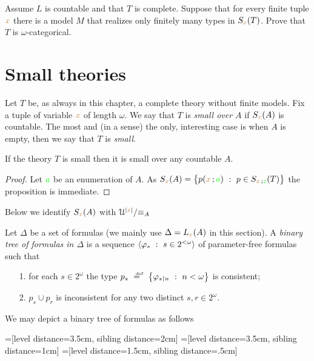 \documentclass[creche.tex]{subfiles}
\begin{document}
\begin{exercise} 
Assume $L$ is countable and that $T$ is complete. Suppose that for every finite tuple  ${\color{brown} x}$ there is a model $M$ that realizes only finitely many types in $S_{\color{brown} x}(T)$. Prove that $T$ is $\omega$-categorical.
\end{exercise}
\section{Small theories}

\def\ceq#1#2#3{\parbox[b]{15ex}{$\displaystyle #1$}\parbox[b]{6ex}{\hfil$#2$}$\displaystyle #3$}


Let $T$ be, as always in this chapter, a complete theory without finite models. Fix a tuple of variable ${\color{brown} x}$ of length $\omega$. We say that $T$ is \emph{small over $A$\/} if $S_{\color{brown} x}(A)$ is countable. The most and (in a sense) the only, interesting case is when $A$ is empty, then we say that  $T$ is \emph{small}.

\begin{proposition}
If the theory $T$ is small then it is small over any countable $A$.
\end{proposition}

\begin{proof}
Let ${\color{green} a}$ be an enumeration of $A$. As $S_{\mr x}(A)=\big\{p({\mr x}\,;{\gr a})\ :\ p\in S_{{\mr x}\,;{\gr z}}(T)\big\}$ the proposition is immediate.
\end{proof}

Below we identify $S_{\color{brown} x}(A)$ with $\EuScript U^{|{\color{brown} x}|}/\mathord\equiv_A$

Let $\Delta$ be a set of formulas (we mainly use $\Delta=L_{\color{brown} x}(A)$ in this section). A \emph{binary tree of formulas in $\Delta$\/} is a sequence $\<\phi_s\ :\ s\in2^{<\omega}\>$ of parameter-free formulas such that\nobreak
\begin{itemize}
\item[1.] for each $s\in 2^\omega$ the type $p_s\ \deq\ \big\{\phi_{s\restriction n}\ :\ n<\omega\big\}$ is consistent;
\item[2.] $p_s\cup p_r$ is inconsistent for any two distinct $s,r\in 2^\omega$.
\end{itemize}
We may depict a binary tree of formulas as follows


=[level distance=3.5cm, sibling distance=2cm]
=[level distance=3.5cm, sibling distance=1cm]
=[level distance=1.5cm, sibling distance=.5cm]
\end{document}

